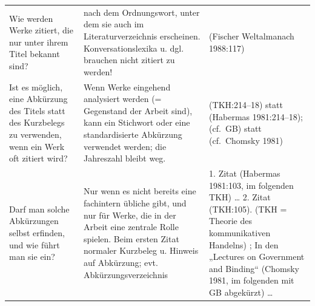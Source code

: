 \documentclass[]{book}
\theoremstyle{definition}
\theoremstyle{definition}
\theoremstyle{definition}
\theoremstyle{remark}
\begin{document}
\begin{longtable}[]{@{}lll@{}}
\begin{minipage}[t]{0.26\columnwidth}
Wie werden Werke zitiert, die nur unter ihrem Titel bekannt sind?\strut
\end{minipage} & \begin{minipage}[t]{0.33\columnwidth}\raggedright\strut
nach dem Ordnungswort, unter dem sie auch im Literaturverzeichnis
erscheinen. Konversationslexika u. dgl. brauchen nicht zitiert zu
werden!\strut
\end{minipage} & \begin{minipage}[t]{0.32\columnwidth}\raggedright\strut
(Fischer Weltalmanach 1988:117) \vspace{-6mm}\strut
\end{minipage}\tabularnewline
\begin{minipage}[t]{0.26\columnwidth}\raggedright\strut
Ist es möglich, eine Abkürzung des Titels statt des Kurzbelegs zu
verwenden, wenn ein Werk oft zitiert wird?\strut
\end{minipage} & \begin{minipage}[t]{0.33\columnwidth}\raggedright\strut
Wenn Werke eingehend analysiert werden (= Gegenstand der Arbeit sind),
kann ein Stichwort oder eine standardisierte Abkürzung verwendet werden;
die Jahreszahl bleibt weg.\strut
\end{minipage} & \begin{minipage}[t]{0.32\columnwidth}\raggedright\strut
(TKH:214--18) statt (Habermas 1981:214--18); (cf.~GB) statt (cf.~Chomsky
1981) \vspace{-6mm}\strut
\end{minipage}\tabularnewline
\begin{minipage}[t]{0.26\columnwidth}\raggedright\strut
Darf man solche Abkürzungen selbst erfinden, und wie führt man sie
ein?\strut
\end{minipage} & \begin{minipage}[t]{0.33\columnwidth}\raggedright\strut
Nur wenn es nicht bereits eine fachintern übliche gibt, und nur für
Werke, die in der Arbeit eine zentrale Rolle spielen. Beim ersten Zitat
normaler Kurzbeleg u. Hinweis auf Abkürzung; evt.
Abkürzungsverzeichnis\strut
\end{minipage} & \begin{minipage}[t]{0.32\columnwidth}\raggedright\strut
1. Zitat (Habermas 1981:103, im folgenden TKH) \ldots{} 2. Zitat
(TKH:105). (TKH = Theorie des kommunikativen Handelns) ; In den
„Lectures on Government and Binding`` (Chomsky 1981, im folgenden mit GB
abgekürzt) \ldots{}\strut
\end{minipage}\tabularnewline
\bottomrule
\end{longtable}
\end{document}
